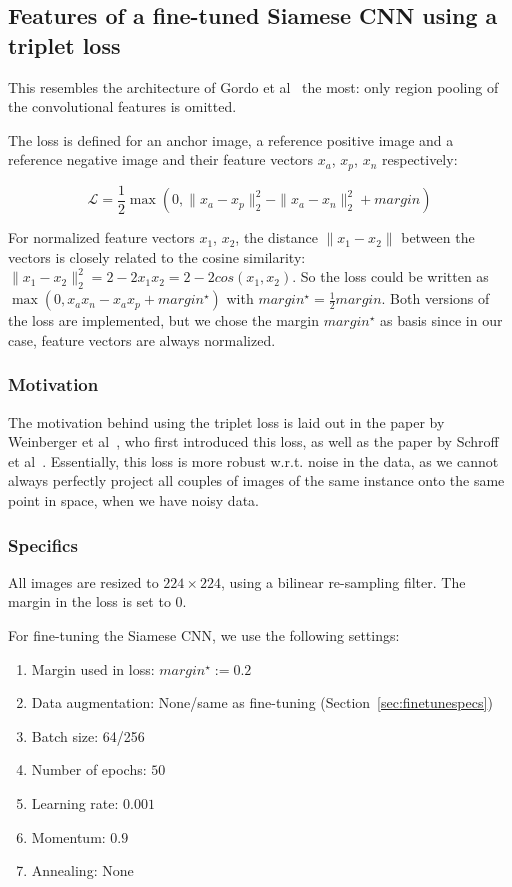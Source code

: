\documentclass[fleqn]{article}
\begin{document}
\subsection{Features of a fine-tuned Siamese CNN using a triplet loss}
This resembles the architecture of Gordo et al~\cite{gordo_deep_2016}
the most: only region pooling of the convolutional features is omitted.

The loss is defined for an anchor image, a reference positive image and
a reference negative image and their feature vectors $x_a$, $x_p$, $x_n$
respectively:

\begin{equation}
\mathcal{L} = \frac{1}{2}
\max(0, \| x_a - x_p \|_2^2 - \| x_a - x_n \|_2^2 + margin)
\end{equation}

For normalized feature vectors $x_1$, $x_2$, the distance $\| x_1 - x_2\|$
between the vectors is closely related to the cosine similarity:
$\| x_1 - x_2 \|_2^2 = 2-2x_1x_2 = 2-2cos(x_1,x_2)$.
So the loss could be written as
$\max(0, x_ax_n - x_ax_p + margin^{\star})$ with
$margin^{\star} = \frac{1}{2} margin$. Both versions of the loss
are implemented, but we chose the margin $margin^{\star}$ as basis
since in our case, feature vectors are always normalized.

\subsubsection{Motivation}
The motivation behind using the triplet loss is laid out in the paper
by Weinberger et al~\cite{weinberger_distance_2006}, who first introduced
this loss, as well as the paper by Schroff et al~\cite{schroff_facenet:_2015}.
Essentially, this loss is more robust w.r.t. noise in the data, as
we cannot always perfectly project all couples of images of the same
instance onto the same point in space, when we have noisy data.

\subsubsection{Specifics}
All images are resized to $224 \times 224$, using a bilinear
re-sampling filter. The margin in the loss is set to 0.

For fine-tuning the Siamese CNN, we use the following settings:
\begin{enumerate}
    \item Margin used in loss: $margin^{\star}:=0.2$
    \item Data augmentation: None/same as fine-tuning
    (Section~\ref{sec:finetunespecs})
    \item Batch size: 64/256
    \item Number of epochs: $50$
    \item Learning rate: $0.001$
    \item Momentum: $0.9$
    \item Annealing: None
\end{enumerate}
\end{document}
